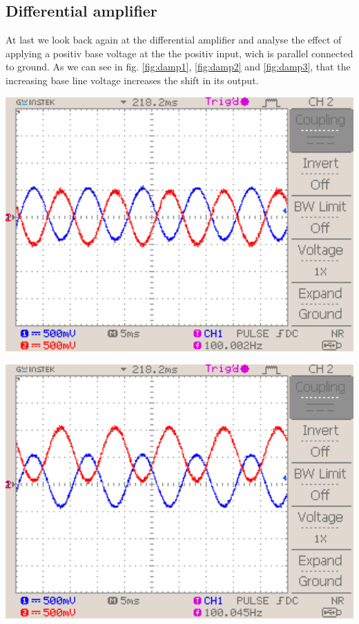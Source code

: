 \documentclass[a4paper,10pt]{article}
\newenvironment{Figure}
        {\par\medskip\noindent\minipage{\linewidth}}
        {\endminipage\par\medskip}
\numberwithin{equation}{section}
\begin{document}
\begin{multicols}{2}
  \subsection{Differential amplifier}
  At last we look back again at the differential amplifier and analyse the effect of applying a positiv base voltage at the the positiv input, wich is parallel connected to ground. As we can see in fig. \ref{fig:damp1}, \ref{fig:damp2} and \ref{fig:damp3}, that the increasing base line voltage increases the shift in its output.
	\begin{Figure} 
		\centering
		\includegraphics[width=1\textwidth]{../data/DS0047_n.png}
		\label{fig:damp1}
	\end{Figure}
	\begin{Figure}
		\centering
		\includegraphics[width=1\textwidth]{../data/DS0048_n.png}

\end{Figure}
\end{multicols}
\end{document}
